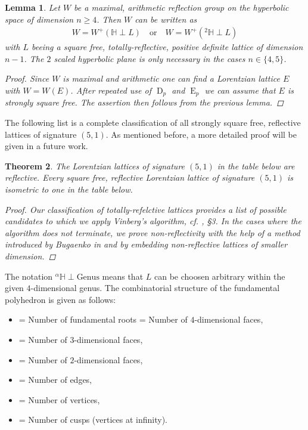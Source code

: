 \documentclass{amsart}
\newtheorem{thm}{Theorem}[section]
\newtheorem{lem}[thm]{Lemma}
\theoremstyle{definition}
\theoremstyle{remark}
\DeclareMathOperator{\D}{D}
\DeclareMathOperator{\E}{E}
\begin{document}
\begin{lem}
Let $W$ be a maximal, arithmetic reflection group on the hyperbolic space of dimension $n \geq 4$. Then $W$ can be written as
 \begin{align*}
  W = W^{+}\left(\mathbb{H} \perp L\right) \quad \text{or} \quad W = W^{+}\left({}^{2}\!{\mathbb{H}} \perp L\right)
 \end{align*}
with $L$ beeing a square free, totally-reflective, positive definite lattice of dimension $n-1$. The $2$ scaled hyperbolic plane is only necessary in the cases $n \in \{4,5\}$.
\begin{proof}
Since $W$ is maximal and arithmetic one can find a Lorentzian lattice $E$ with $W = W(E)$. After repeated use of $\D_p$ and $\E_p$ we can assume that $E$ is strongly square free. The assertion then 
follows from the previous lemma.
\end{proof}
\end{lem}
The following list is a complete classification of all strongly square free, reflective lattices of signature $(5,1)$. As mentioned before, a more detailed proof will be given in a future work.
\begin{thm}
The Lorentzian lattices of signature $(5,1)$ in the table below are reflective. Every square free, reflective Lorentzian lattice of signature $(5,1)$ is isometric to one in the table below.
 \begin{proof}
  Our classification of totally-refelctive lattices provides a list of possible candidates to which we apply Vinberg's algorithm, cf. \cite{vin272}, \S 3.
  In the cases where the algorithm does not terminate, we prove non-reflectivity with the help of a method introduced by Bugaenko in \cite{bug92} and by embedding non-reflective 
  lattices of smaller dimension.
 \end{proof}
\end{thm}

The notation ${}^{\alpha}\!{\mathbb{H}} \perp \text{Genus}$ means that $L$ can be choosen arbitrary within the given $4$-dimensional genus.
The combinatorial structure of the fundamental polyhedron is given as follows:
\begin{itemize}
\item[$r$] = Number of fundamental roots = Number of $4$-dimensional faces,
\item[$f_3$] = Number of $3$-dimensional faces,
\item[$f_2$] = Number of $2$-dimensional faces,
\item[$e$] = Number of edges,
\item[$v$] = Number of vertices,
\item[$c$] = Number of cusps (vertices at infinity).
\end{itemize}
\end{document}
